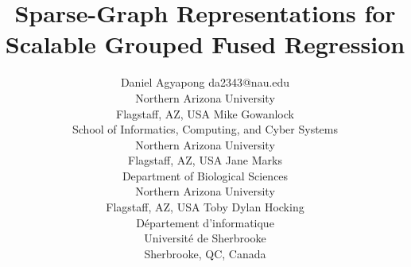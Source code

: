 \documentclass[twoside,11pt]{article}
\begin{document}
\title{Sparse-Graph Representations for Scalable Grouped Fused Regression}

\author{\name Daniel Agyapong \email da2343@nau.edu \\
       \addr Northern Arizona University\\
       Flagstaff, AZ, USA
       \AND
       \name Mike Gowanlock \\
       \addr School of Informatics, Computing, and Cyber Systems\\
       Northern Arizona University\\
       Flagstaff, AZ, USA
       \AND
       \name Jane Marks \\
       \addr Department of Biological Sciences\\
       Northern Arizona University\\
       Flagstaff, AZ, USA
       \AND
       \name Toby Dylan Hocking \\
       \addr D\'epartement d'informatique\\
       Universit\'e de Sherbrooke\\
       Sherbrooke, QC, Canada}

\editor{}

\maketitle
\end{document}

